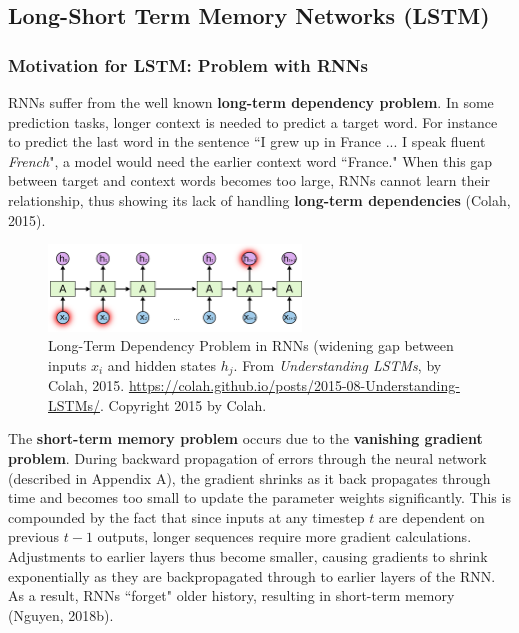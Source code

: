     
\subsection{Long-Short Term Memory Networks (LSTM)}

\subsubsection{Motivation for LSTM: Problem with RNNs}

RNNs suffer from the well known \textbf{long-term dependency problem}. In some prediction tasks, longer context is needed to predict a target word. For instance to predict the last word in the sentence ``I grew up in France ... I speak fluent \emph{French}", a model would need the earlier context word ``France." When this gap between target and context words becomes too large, RNNs cannot learn their relationship, thus showing its lack of handling \textbf{long-term dependencies} (Colah, 2015). 

\begin{figure}[h]
\centering
\includegraphics[width=0.6\textwidth]{imgs/rnn_longterm.png}
\caption{Long-Term Dependency Problem in RNNs (widening gap between inputs $x_i$ and hidden states $h_j$. From \emph{Understanding LSTMs}, by Colah, 2015. \url{https://colah.github.io/posts/2015-08-Understanding-LSTMs/}. Copyright 2015 by Colah.}
\end{figure}

The \textbf{short-term memory problem} occurs due to the \textbf{vanishing gradient problem}. During backward propagation of errors through the neural network (described in Appendix A), the gradient shrinks as it back propagates through time and becomes too small to update the parameter weights significantly. This is compounded by the fact that since inputs at any timestep $t$ are dependent on previous $t-1$ outputs, longer sequences require more gradient calculations. Adjustments to earlier layers thus become smaller, causing gradients to shrink exponentially as they are backpropagated through to earlier layers of the RNN. As a result, RNNs ``forget" older history, resulting in short-term memory (Nguyen, 2018b). 


